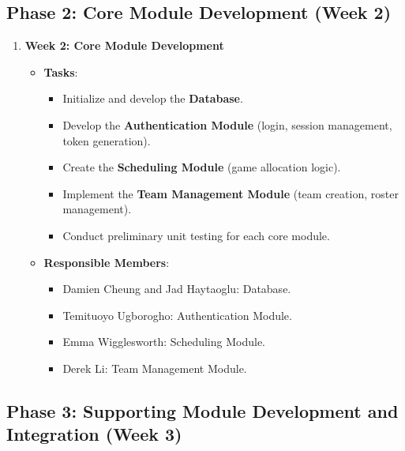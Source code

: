 \documentclass[12pt, titlepage]{article}
\begin{document}
\subsection*{Phase 2: Core Module Development (Week 2)}

\begin{enumerate}
  \item \textbf{Week 2: Core Module Development}
        \begin{itemize}
          \item \textbf{Tasks}:
                \begin{itemize}
                  \item Initialize and develop the \textbf{Database}.
                  \item Develop the \textbf{Authentication Module} (login, session management, token generation).
                  \item Create the \textbf{Scheduling Module} (game allocation logic).
                  \item Implement the \textbf{Team Management Module} (team creation, roster management).
                  \item Conduct preliminary unit testing for each core module.
                \end{itemize}
          \item \textbf{Responsible Members}:
                \begin{itemize}
                  \item Damien Cheung and Jad Haytaoglu: Database.
                  \item Temituoyo Ugborogho: Authentication Module.
                  \item Emma Wigglesworth: Scheduling Module.
                  \item Derek Li: Team Management Module.
                \end{itemize}
        \end{itemize}
\end{enumerate}

\subsection*{Phase 3: Supporting Module Development and Integration (Week 3)}
\end{document}
